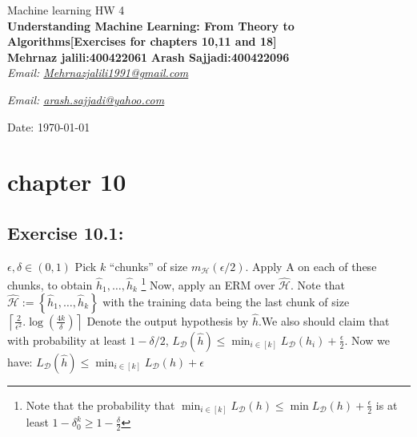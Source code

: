 \documentclass[]{book}
\begin{document}
\begin{center}
{\Large Machine learning \hspace{0.5cm} HW 4}\\
\textbf{\small{Understanding Machine Learning: From Theory to Algorithms}[Exercises for chapters 10,11 and 18]}\\
\textbf{
Mehrnaz jalili:400422061}
\textbf{
Arash Sajjadi:400422096}\\ %
\textit{Email: \href{mailto:Mehrnazjalili1991@gmail.com}{Mehrnazjalili1991@gmail.com}} 

\textit{Email: \href{mailto:arash.sajjadi@yahoo.com}{arash.sajjadi@yahoo.com}} 


Date: \today %
\end{center}

\vspace{0.2 cm}

\section*{chapter 10}
\subsection*{Exercise 10.1:}

$\epsilon, \delta\in\left ( 0,1 \right )$  Pick $k$ “chunks” of size $m_\mathcal{H}\left ( \epsilon/2 \right )$. Apply A on each of these chunks, to obtain $\hat{h}_1,\hdots,\hat{h}_k$ \footnote{ Note that the probability that $\min_{i\in [k]}L_\mathcal{D}(h)\leq \min L_\mathcal{D}(h)+\frac{\epsilon}{2}$ is at least $1-\delta_0^k\geq 1-\frac{\delta}{2}$}  Now,
apply an ERM over $\hat{\mathcal{H}}$. Note that $\hat{\mathcal{H}}:=\left \{ \hat{h}_1,\hdots,\hat{h}_k \right \}$  with the training data being the last chunk of size $\left \lceil \frac{2}{\epsilon^2} .\log\left ( \frac{4k}{\delta} \right ) \right \rceil$  Denote the output hypothesis by $\hat{h}$.We also should claim that with probability at least $1-\delta/2$, $L_\mathcal{D}(\hat{h})\leq \min_{i\in [k]} L_\mathcal{D}(h_i)+\frac{\epsilon}{2}$. Now we have: $L_\mathcal{D}(\hat{h})\leq \min_{i\in [k]} L_\mathcal{D}(h)+\epsilon$



\end{document}
